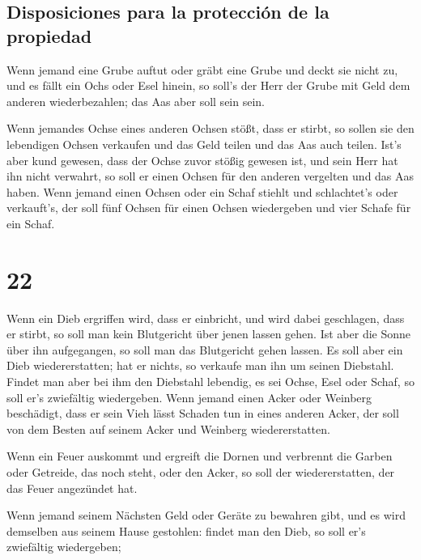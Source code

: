 \hypertarget{disposiciones-para-la-protecciuxf3n-de-la-propiedad}{%
\subsection{Disposiciones para la protección de la
propiedad}\label{disposiciones-para-la-protecciuxf3n-de-la-propiedad}}

 Wenn jemand eine Grube auftut oder gräbt eine Grube und
deckt sie nicht zu, und es fällt ein Ochs oder Esel hinein,
 so soll's der Herr der Grube mit Geld dem anderen
wiederbezahlen; das Aas aber soll sein sein.

 Wenn jemandes Ochse eines anderen Ochsen stößt, dass er
stirbt, so sollen sie den lebendigen Ochsen verkaufen und das Geld
teilen und das Aas auch teilen.  Ist's aber kund gewesen,
dass der Ochse zuvor stößig gewesen ist, und sein Herr hat ihn nicht
verwahrt, so soll er einen Ochsen für den anderen vergelten und das Aas
haben.  Wenn jemand einen Ochsen oder ein Schaf stiehlt
und schlachtet's oder verkauft's, der soll fünf Ochsen für einen Ochsen
wiedergeben und vier Schafe für ein Schaf.

\hypertarget{section-21}{%
\section{22}\label{section-21}}

 Wenn ein Dieb ergriffen wird, dass er einbricht, und wird
dabei geschlagen, dass er stirbt, so soll man kein Blutgericht über
jenen lassen gehen.  Ist aber die Sonne über ihn
aufgegangen, so soll man das Blutgericht gehen lassen. Es soll aber ein
Dieb wiedererstatten; hat er nichts, so verkaufe man ihn um seinen
Diebstahl.  Findet man aber bei ihm den Diebstahl
lebendig, es sei Ochse, Esel oder Schaf, so soll er's zwiefältig
wiedergeben.  Wenn jemand einen Acker oder Weinberg
beschädigt, dass er sein Vieh lässt Schaden tun in eines anderen Acker,
der soll von dem Besten auf seinem Acker und Weinberg wiedererstatten.

 Wenn ein Feuer auskommt und ergreift die Dornen und
verbrennt die Garben oder Getreide, das noch steht, oder den Acker, so
soll der wiedererstatten, der das Feuer angezündet hat.

 Wenn jemand seinem Nächsten Geld oder Geräte zu bewahren
gibt, und es wird demselben aus seinem Hause gestohlen: findet man den
Dieb, so soll er's zwiefältig wiedergeben;

